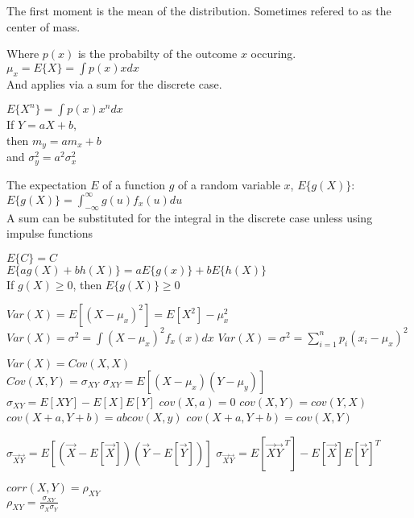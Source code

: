 
The first moment is the mean of the distribution. Sometimes refered to as the center of mass.

Where $p(x)$ is the probabilty of the outcome $x$ occuring.
$\mu_x=E\{X\}=\int p(x)xdx$\\
And applies via a sum for the discrete case.

$E\{X^n\}=\int p(x)x^ndx$\\


If $Y=aX+b$, \\ 
then $m_y=am_x+b$ \\
and 
$\sigma_y^2=a^2\sigma_x^2$

The expectation $E$ of a function $g$ of a random variable $x$, $E\{g(X)\}$: \\
$E\{g(X)\}=\int_{-\infty}^{\infty}g(u)f_x(u)du$ \\
A sum can be substituted for the integral in the discrete case unless using impulse functions

$E\{C\}=C$ \\
$E\{ag(X)+bh(X)\}=aE\{g(x)\}+bE\{h(X)\}$ \\
If $g(X)\geq 0$, then $E\{g(X)\} \geq 0$

$Var(X)=E\left[(X-\mu_x)^2\right]=E[X^2]-\mu_x^2$
$Var(X)=\sigma^2=\int(X-\mu_x)^2f_x(x)dx$
$Var(X)=\sigma^2=\sum_{i=1}^{n}p_i(x_i-\mu_x)^2$
    
$Var(X)=Cov(X,X)$\\
$Cov(X,Y)=\sigma_{XY}$
$\sigma_{XY}=E[(X-\mu_x)(Y-\mu_y)]$
$\sigma_{XY}=E[XY]-E[X]E[Y]$
$cov(X, a) = 0$
$cov(X,Y) = cov(Y,X)$
$cov(X+a, Y+b)=abcov(X,y)$
$cov(X+a,Y+b)=cov(X,Y)$

$\sigma_{\vec{X}\vec{Y}}=E[(\vec{X}-E[\vec{X}])(\vec{Y}-E[\vec{Y}])]$
$\sigma_{\vec{X}\vec{Y}}=E[\vec{X}\vec{Y}^{\,T}]-E[\vec{X}]E[\vec{Y}]^T$

$corr(X,Y)=\rho_{XY}$\\
$\rho_{XY}=\frac{\sigma_{XY}}{\sigma_X\sigma_Y}$




